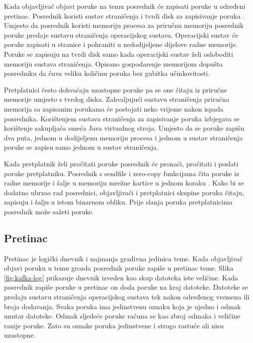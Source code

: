 \documentclass[utf8, diplomski, lmodern, numeric]{fer}
\begin{document}
Kada objavljivač objavi poruke na temu posrednik će zapisati poruke u određeni pretinac. Posrednik koristi sustav straničenja  i tvrdi disk za zapisivanje poruka \citep{kafka-paging}. Umjesto da posrednik koristi memoriju procesa za priručnu memoriju posrednik poruke predaje sustavu straničenja operacijskog sustava. Operacijski sustav će poruke zapisati u stranice i pohraniti u nedodijeljene dijelove radne memorije. Poruke se zapisuju na tvrdi disk samo kada operacijski sustav želi osloboditi memoriju sustava straničenja. Opisano gospodarenje memorijom dopušta posredniku da čuva veliku količinu poruka bez gubitka učinkovitosti.

Pretplatnici često dohvaćaju uzastopne poruke pa se one čitaju iz priručne memorije umjesto s tvrdog diska. Zahvaljujući sustavu straničenja priručna memorija sa zapisanim porukama će postojati neko vrijeme nakon ispada posrednika. Korištenjem sustava straničenja za zapisivanje poruka izbjegava se korištenje sakupljača smeća Java virtualnog stroja. Umjesto da se poruke zapišu dva puta, jednom u dodijeljenu memoriju procesa i jednom u sustav straničenja poruke se zapisu samo jednom u sustav straničenja.

Kada pretplatnik želi pročitati poruke posrednik će pronaći, pročitati i poslati poruke pretplatniku. Posrednik s sendfile i zero-copy funkcijama čita poruke iz radne memorije i šalje u memoriju mrežne kartice u jednom koraku \citep{linux-sendfile} \citep{java-zero-copy}. Kako bi se dodatno ubrzao rad posrednici, objavljivači i pretplatnici skupine poruka čitaju, zapisuju i šalju u istom binarnom obliku. Prije slanja poruka pretplatnicima posrednik može sažeti poruke.

\subsection{Pretinac}

Pretinac  je logički dnevnik  i najmanja gradivna jedinica teme. Kada objavljivač objavi poruku u temu grozda posrednik poruke zapiše u pretinac teme. Slika \ref{fig:kafka-log} prikazuje dnevnik izveden kao skup datoteka iste veličine. Kada posrednik zapiše poruke u pretinac on doda poruke na kraj datoteke. Datoteke se predaju sustavu straničenja operacijskog sustava tek nakon određenog vremena ili broja dodavanja. Svaka poruka ima jedinstvenu oznaku koja je ujedno i odmak unutar datoteke. Odmak sljedeće poruke računa se kao zbroj odmaka i veličine ranije poruke. Zato su oznake poruka jedinstvene i strogo rastuće ali nisu uzastopne.
\end{document}
